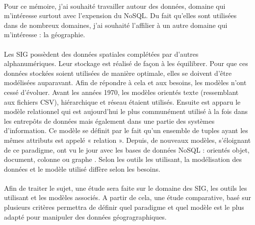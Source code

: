 \paragraph{}Pour ce mémoire, j'ai souhaité travailler autour des données, domaine qui m'intéresse surtout avec l'expension du NoSQL. Du fait qu'elles sont utilisées dans de nombreux domaines, j'ai souhaité l'affilier à un autre domaine qui m'intéresse : la géographie.

\paragraph{}Les SIG possèdent des données spatiales complétées par d'autres alphanumériques. Leur stockage est réalisé de façon à les équilibrer. Pour que ces données stockées soient utilisées de manière optimale, elles se doivent d'être modélisées auparavant. Afin de répondre à cela et aux besoins, les modèles n'ont cessé d'évoluer. Avant les années 1970, les modèles orientés texte (ressemblant aux fichiers CSV), hiérarchique et réseau étaient utilisés. Ensuite est apparu le modèle relationnel qui est aujourd'hui le plus communément utilisé à la fois dans les entrepôts de données mais également dans une partie des systèmes d'information. Ce modèle se définit par le fait qu'un ensemble de tuples ayant les mêmes attributs est appelé « relation ». Depuis, de nouveaux modèles, s'éloignant de ce paradigme, ont vu le jour avec les bases de données NoSQL : orientés objet, document, colonne ou graphe \supercite{modeles}. Selon les outils les utilisant, la modélisation des données et le modèle utilisé diffère selon les besoins.


\paragraph{}Afin de traiter le sujet, une étude sera faite sur le domaine des \acrshort{SIG}, les outils les utilisant et les modèles associés. A partir de cela, une étude comparative, basé sur plusieurs critères permettra de définir quel paradigme et quel modèle est le plus adapté pour manipuler des données géogragraphiques.



